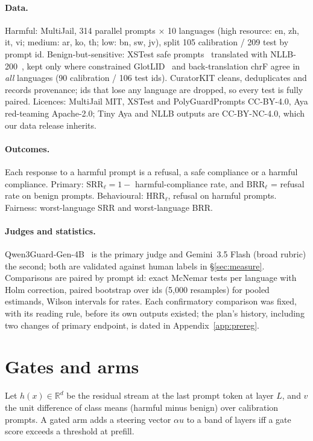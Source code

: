 \documentclass{article}
\newcommand{\HRR}{\mathrm{HRR}}\newcommand{\BRR}{\mathrm{BRR}}\newcommand{\SRR}{\mathrm{SRR}}
\begin{document}
\paragraph{Data.} Harmful: MultiJail, 314 parallel prompts $\times$ 10 languages (high resource: en, zh, it, vi; medium: ar, ko, th; low: bn, sw, jv), split 105 calibration / 209 test by prompt id. Benign-but-sensitive: XSTest safe prompts~\citep{rottger2024xstest} translated with NLLB-200~\citep{costa2022nllb}, kept only where constrained GlotLID~\citep{kargaran2023glotlid} and back-translation chrF agree in \emph{all} languages (90 calibration / 106 test ids). CuratorKIT cleans, deduplicates and records provenance; ids that lose any language are dropped, so every test is fully paired. Licences: MultiJail MIT, XSTest and PolyGuardPrompts CC-BY-4.0, Aya red-teaming Apache-2.0; Tiny Aya and NLLB outputs are CC-BY-NC-4.0, which our data release inherits.
\paragraph{Outcomes.} Each response to a harmful prompt is a refusal, a safe compliance or a harmful compliance. Primary: $\SRR_\ell=1-$ harmful-compliance rate, and $\BRR_\ell$ = refusal rate on benign prompts. Behavioural: $\HRR_\ell$, refusal on harmful prompts. Fairness: worst-language SRR and worst-language BRR.
\paragraph{Judges and statistics.} Qwen3Guard-Gen-4B~\citep{qwen3guard2025} is the primary judge and Gemini~3.5 Flash (broad rubric) the second; both are validated against human labels in \S\ref{sec:measure}. Comparisons are paired by prompt id: exact McNemar tests per language with Holm correction, paired bootstrap over ids (5{,}000 resamples) for pooled estimands, Wilson intervals for rates. Each confirmatory comparison was fixed, with its reading rule, before its own outputs existed; the plan's history, including two changes of primary endpoint, is dated in Appendix~\ref{app:prereg}.

\section{Gates and arms}
\label{sec:method}
Let $h(x)\in\mathbb{R}^d$ be the residual stream at the last prompt token at layer $L$, and $v$ the unit difference of class means (harmful minus benign) over calibration prompts. A gated arm adds a steering vector $\alpha u$ to a band of layers iff a gate score exceeds a threshold at prefill.
\end{document}
